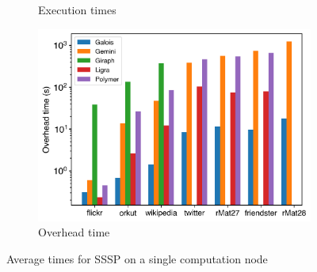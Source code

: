 \begin{figure}[ht]
\begin{subfigure}{0.32\textwidth}
		\caption{Execution times}
		\label{fig:singleNodeSSSP_exec}
	\end{subfigure}
	\hfil
	\begin{subfigure}{0.32\textwidth}
		\includegraphics[width=\linewidth]{../../plots/singleNodeSSSP_overheadTime.png}
		\caption{Overhead time}
		\label{fig:singleNodeSSSP_overhead}
	\end{subfigure}
	\caption{Average times for SSSP on a single computation node}
	\label{fig:singleNodeSSSP}
\end{figure}
